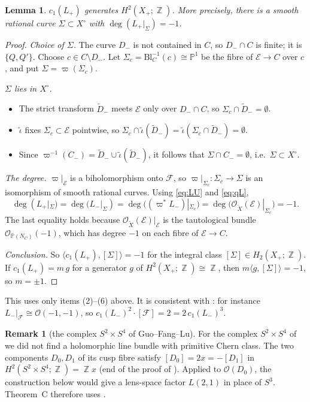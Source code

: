 \documentclass{article}
\DeclareMathOperator{\Z}{\mathbb{Z}}
\newtheorem{lemma}[theorem]{Lemma}
\theoremstyle{definition}
\newtheorem{remark}[theorem]{Remark}
\theoremstyle{plain}
\newcommand{\PP}{\mathbb{P}}
\newcommand{\cO}{\mathcal{O}}
\begin{document}
\begin{lemma}\label{lem:primitive}
$c_1(L_+)$ generates $H^2(X_+;\Z)$. More precisely, there is a smooth rational curve
$\Sigma\subset X^\circ$ with $\deg(L_+|_\Sigma)=-1$.
\end{lemma}
\begin{proof}
\emph{Choice of $\Sigma$.} The curve $D_-$ is not contained in $C$, so $D_-\cap C$ is finite;
it is $\{Q,Q'\}$. Choose $c\in C\setminus D_-$. Let $\Sigma_c=\mathrm{Bl}_C^{-1}(c)\cong\PP^1$ be
the fibre of $\mathcal E\to C$ over $c$, and put $\Sigma=\varpi(\Sigma_c)$.

\emph{$\Sigma$ lies in $X^\circ$.}
\begin{itemize}
\item The strict transform $\widetilde D_-$ meets $\mathcal E$ only over $D_-\cap C$, so
  $\Sigma_c\cap\widetilde D_-=\emptyset$.
\item $\tilde\iota$ fixes $\Sigma_c\subset\mathcal E$ pointwise, so
  $\Sigma_c\cap\tilde\iota(\widetilde D_-)=\tilde\iota(\Sigma_c\cap\widetilde D_-)=\emptyset$.
\item Since $\varpi^{-1}(C_-)=\widetilde D_-\cup\tilde\iota(\widetilde D_-)$, it follows that
  $\Sigma\cap C_-=\emptyset$, i.e.\ $\Sigma\subset X^\circ$.
\end{itemize}

\emph{The degree.} $\varpi|_{\mathcal E}$ is a biholomorphism onto $\mathcal F$, so
$\varpi|_{\Sigma_c}\colon\Sigma_c\to\Sigma$ is an isomorphism of smooth rational curves.
Using \eqref{eq:LU} and \eqref{eq:qL},
\[
\deg(L_+|_\Sigma)=\deg(L_-|_\Sigma)=\deg\big((\varpi^*L_-)|_{\Sigma_c}\big)=\deg\big(\cO_{\widetilde X}(\mathcal E)|_{\Sigma_c}\big)=-1.
\]
The last equality holds because $\cO_{\widetilde X}(\mathcal E)|_{\mathcal E}$ is the
tautological bundle $\cO_{\PP(N_{C})}(-1)$, which has degree $-1$ on each fibre of
$\mathcal E\to C$.

\emph{Conclusion.} So $\langle c_1(L_+),[\Sigma]\rangle=-1$ for the integral class
$[\Sigma]\in H_2(X_+;\Z)$. If $c_1(L_+)=m\,g$ for a generator $g$ of $H^2(X_+;\Z)\cong\Z$, then
$m\langle g,[\Sigma]\rangle=-1$, so $m=\pm1$.
\end{proof}

This uses only items (2)--(6) above. It is consistent with \cite[Lemma 4.1]{LLZ26}: for
instance $L_-|_{\mathcal F}\cong\cO(-1,-1)$, so $c_1(L_-)^2\cdot[\mathcal F]=2=2\,c_1(L_-)^3$.

\begin{remark}[the complex $S^2\times S^4$ of Guo--Fang--Lu]
For the complex $S^2\times S^4$ of \cite{GFL26} we did not find a holomorphic line bundle
with primitive Chern class. The two components $D_0,D_1$ of its cusp fibre satisfy
$[D_0]=2x=-[D_1]$ in $H^2(S^2\times S^4;\Z)=\Z x$ (end of the proof of
\cite[Prop.~2.2]{GFL26}). Applied to $\cO(D_0)$, the construction below would give a
lens-space factor $L(2,1)$ in place of $S^3$. Theorem~C therefore uses \cite{LLZ26}.
\end{remark}
\end{document}
